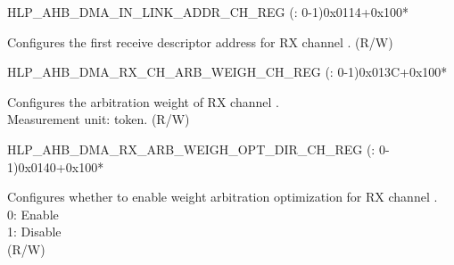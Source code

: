 \begin{register}{H}{LP\_AHB\_DMA\_IN\_LINK\_ADDR\_CH\_REG (: 0-1)}{0x0114+0x100*}\label{regdesc:LPAHBDMAINLINKADDRCHNREG}
%
\regnewline%
\begin{regdesc}\begin{reglist}
\label{fielddesc:LPAHBDMAINLINKADDRCHN}\item [LP\_AHB\_DMA\_INLINK\_ADDR\_CH\regindex{n}] Configures the first receive descriptor address for RX channel . (R/W)
\end{reglist}\end{regdesc}
\end{register}


\begin{register}{H}{LP\_AHB\_DMA\_RX\_CH\_ARB\_WEIGH\_CH\_REG (: 0-1)}{0x013C+0x100*}\label{regdesc:LPAHBDMARXCHARBWEIGHCHNREG}
%
%
\regnewline%
\begin{regdesc}\begin{reglist}
\label{fielddesc:LPAHBDMARXCHARBWEIGHCHN}\item [LP\_AHB\_DMA\_RX\_CH\_ARB\_WEIGH\_CH\regindex{n}] Configures the arbitration weight of RX channel .\\Measurement unit: token. (R/W)
\end{reglist}\end{regdesc}
\end{register}


\begin{register}{H}{LP\_AHB\_DMA\_RX\_ARB\_WEIGH\_OPT\_DIR\_CH\_REG (: 0-1)}{0x0140+0x100*}\label{regdesc:LPAHBDMARXARBWEIGHOPTDIRCHNREG}
%
%
\regnewline%
\begin{regdesc}\begin{reglist}
\label{fielddesc:LPAHBDMARXARBWEIGHOPTDIRCHN}\item [LP\_AHB\_DMA\_RX\_ARB\_WEIGH\_OPT\_DIR\_CH\regindex{n}] Configures whether to enable weight arbitration optimization for RX channel .\\
0: Enable\\
1: Disable\\ (R/W)
\end{reglist}\end{regdesc}
\end{register}


